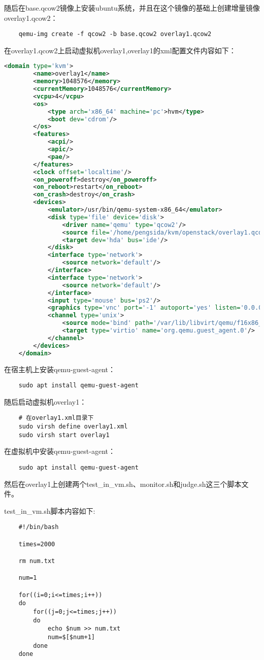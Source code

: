 \documentclass[a4paper,left=1.5cm,right=1.5cm,11pt]{article}
\begin{document}
	随后在base.qcow2镜像上安装ubuntu系统，并且在这个镜像的基础上创建增量镜像overlay1.qcow2：
	\begin{lstlisting}
	qemu-img create -f qcow2 -b base.qcow2 overlay1.qcow2
	\end{lstlisting}

	在overlay1.qcow2上启动虚拟机overlay1,overlay1的xml配置文件内容如下：
	\begin{lstlisting}[language = xml]
	<domain type='kvm'>
		<name>overlay1</name>
		<memory>1048576</memory>
		<currentMemory>1048576</currentMemory>
		<vcpu>4</vcpu>
		<os>
			<type arch='x86_64' machine='pc'>hvm</type>
			<boot dev='cdrom'/>
		</os>
		<features>
			<acpi/>
			<apic/>
			<pae/>
		</features>
		<clock offset='localtime'/>
		<on_poweroff>destroy</on_poweroff>
		<on_reboot>restart</on_reboot>
		<on_crash>destroy</on_crash>
		<devices>
			<emulator>/usr/bin/qemu-system-x86_64</emulator>
			<disk type='file' device='disk'>
				<driver name='qemu' type='qcow2'/>
				<source file='/home/pengsida/kvm/openstack/overlay1.qcow2'/>
				<target dev='hda' bus='ide'/>
			</disk>
			<interface type='network'>
				<source network='default'/>
			</interface>
			<interface type='network'>
				<source network='default'/>
			</interface>
			<input type='mouse' bus='ps2'/>
			<graphics type='vnc' port='-1' autoport='yes' listen='0.0.0.0' keymap='en-us'/>
			<channel type='unix'>
				<source mode='bind' path='/var/lib/libvirt/qemu/f16x86_64.agent'/>
				<target type='virtio' name='org.qemu.guest_agent.0'/>
			</channel>
		</devices>
	</domain>
	\end{lstlisting}

	在宿主机上安装qemu-guest-agent：
	\begin{lstlisting}
	sudo apt install qemu-guest-agent
	\end{lstlisting}

	随后启动虚拟机overlay1：
	\begin{lstlisting}
	# 在overlay1.xml目录下
	sudo virsh define overlay1.xml
	sudo virsh start overlay1
	\end{lstlisting}

	在虚拟机中安装qemu-guest-agent：
	\begin{lstlisting}
	sudo apt install qemu-guest-agent
	\end{lstlisting}

	然后在overlay1上创建两个test\_in\_vm.sh、monitor.sh和judge.sh这三个脚本文件。\par

	test\_in\_vm.sh脚本内容如下:
	\begin{lstlisting}
	#!/bin/bash

	times=2000

	rm num.txt

	num=1

	for((i=0;i<=times;i++))
	do
		for((j=0;j<=times;j++))
		do
			echo $num >> num.txt
			num=$[$num+1]
		done
	done
	\end{lstlisting}
\end{document}
